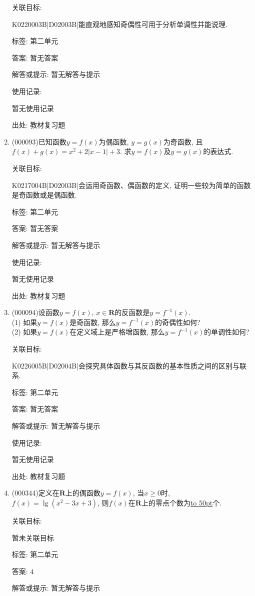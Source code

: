 \documentclass[10pt,a4paper]{article}
\newcommand{\blank}[1]{\underline{\hbox to #1pt{}}}
\begin{document}
\begin{enumerate}[1.]
关联目标:

K0220003B|D02003B|能直观地感知奇偶性可用于分析单调性并能说理.



标签: 第二单元

答案: 暂无答案

解答或提示: 暂无解答与提示

使用记录:

暂无使用记录


出处: 教材复习题
\item { (000093)}已知函数$y=f(x)$为偶函数, $y=g(x)$为奇函数, 且$f(x)+g(x)=x^2+2|x-1|+3$. 求$y=f(x)$及$y=g(x)$的表达式.


关联目标:

K0217004B|D02003B|会运用奇函数、偶函数的定义, 证明一些较为简单的函数是奇函数或是偶函数.



标签: 第二单元

答案: 暂无答案

解答或提示: 暂无解答与提示

使用记录:

暂无使用记录


出处: 教材复习题
\item { (000094)}设函数$y=f(x)$, $x\in \mathbf{R}$的反函数是$y=f^{-1}(x)$.\\
(1) 如果$y=f(x)$是奇函数, 那么$y=f^{-1}(x)$的奇偶性如何?\\
(2) 如果$y=f(x)$在定义域上是严格增函数, 那么$y=f^{-1}(x)$的单调性如何?


关联目标:

K0226005B|D02004B|会探究具体函数与其反函数的基本性质之间的区别与联系.



标签: 第二单元

答案: 暂无答案

解答或提示: 暂无解答与提示

使用记录:

暂无使用记录


出处: 教材复习题
\item { (000344)}定义在$\mathbf{R}$上的偶函数$y=f(x)$, 当$x\ge 0$时, $f(x)=\lg (x^2-3x+3)$, 则$f(x)$在$\mathbf{R}$上的零点个数为\blank{50}个.


关联目标:

暂未关联目标



标签: 第二单元

答案: $4$

解答或提示: 暂无解答与提示


\end{enumerate}
\end{document}
